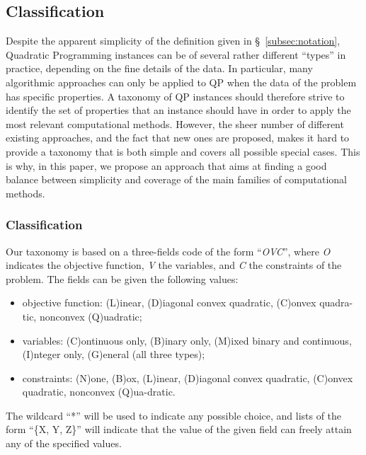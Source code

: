 

\subsection{Classification}\label{sec:classification}

Despite the apparent simplicity of the definition given in \S~\ref{subsec:notation}, Quadratic Programming instances can be of several rather different ``types'' in practice, depending on the fine details of the data. In particular, many algorithmic approaches can only be applied to QP when the data of the problem has specific properties. A taxonomy of QP instances should therefore strive to identify the set of properties that an instance should have in order to apply the most relevant computational methods. However, the sheer number of different existing approaches, and the fact that new ones are proposed, makes it hard to provide a taxonomy that is both simple and covers all possible special cases. This is why, in this paper, we propose an approach that aims at finding a good balance between simplicity and coverage of the main families of computational methods.

\subsubsection{Classification}\label{ssec:taxonomy}

Our taxonomy is based on a three-fields code of the form ``\textit{OVC}'', where \textit{O} indicates the objective function, \textit{V} the variables, and \textit{C} the constraints of the problem. The fields can be given the following values:
%
\begin{itemize}
 \item objective function: (L)inear, (D)iagonal convex quadratic, (C)onvex quadra-tic, nonconvex (Q)uadratic;
 \item variables: (C)ontinuous only, (B)inary only, (M)ixed binary and continuous, (I)nteger only, (G)eneral (all three types);
 \item constraints: (N)one, (B)ox, (L)inear, (D)iagonal convex quadratic, (C)onvex quadratic, nonconvex (Q)ua-dratic.
\end{itemize}
%
The wildcard ``*'' will be used to indicate any possible choice, and lists of the form ``\{X, Y, Z\}'' will indicate that the value of the given field can freely attain any of the specified values.

